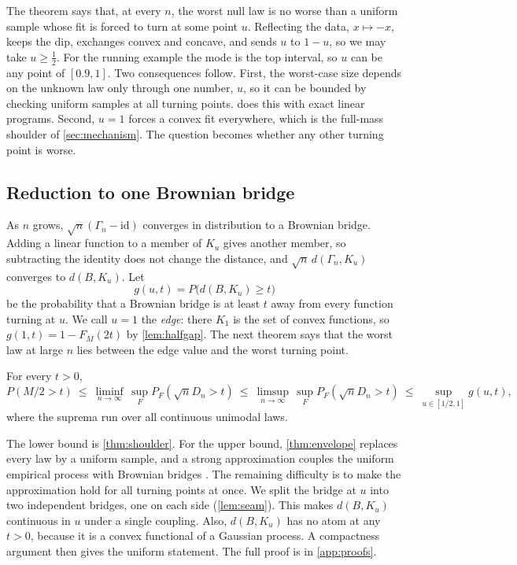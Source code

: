 The theorem says that, at every $n$, the worst null law is no worse than a uniform sample whose fit is forced to turn at some point $u$. Reflecting the data, $x\mapsto-x$, keeps the dip, exchanges convex and concave, and sends $u$ to $1-u$, so we may take $u\ge\frac12$. For the running example the mode is the top interval, so $u$ can be any point of $[0.9,1]$. Two consequences follow. First, the worst-case size depends on the unknown law only through one number, $u$, so it can be bounded by checking uniform samples at all turning points.  does this with exact linear programs. Second, $u=1$ forces a convex fit everywhere, which is the full-mass shoulder of \cref{sec:mechanism}. The question becomes whether any other turning point is worse.

\subsection{Reduction to one Brownian bridge}
As $n$ grows, $\sqrt n(\Gamma_n-\mathrm{id})$ converges in distribution to a Brownian bridge. Adding a linear function to a member of $K_u$ gives another member, so subtracting the identity does not change the distance, and $\sqrt n\,d(\Gamma_n,K_u)$ converges to $d(B,K_u)$. Let
\[
g(u,t)=P\bigl(d(B,K_u)\ge t\bigr)
\]
be the probability that a Brownian bridge is at least $t$ away from every function turning at $u$. We call $u=1$ the \emph{edge}: there $K_1$ is the set of convex functions, so $g(1,t)=1-F_M(2t)$ by \cref{lem:halfgap}. The next theorem says that the worst law at large $n$ lies between the edge value and the worst turning point.

\begin{theorem}\label{thm:reduction}
For every $t>0$,
\[
P(M/2>t)\ \le\ \liminf_{n\to\infty}\,\sup_F P_F(\sqrt nD_n>t)\ \le\ \limsup_{n\to\infty}\,\sup_F P_F(\sqrt nD_n>t)\ \le\ \sup_{u\in[1/2,1]}g(u,t),
\]
where the suprema run over all continuous unimodal laws.
\end{theorem}

The lower bound is \cref{thm:shoulder}. For the upper bound, \cref{thm:envelope} replaces every law by a uniform sample, and a strong approximation couples the uniform empirical process with Brownian bridges \cite{KMT75}. The remaining difficulty is to make the approximation hold for all turning points at once. We split the bridge at $u$ into two independent bridges, one on each side (\cref{lem:seam}). This makes $d(B,K_u)$ continuous in $u$ under a single coupling. Also, $d(B,K_u)$ has no atom at any $t>0$, because it is a convex functional of a Gaussian process. A compactness argument then gives the uniform statement. The full proof is in \cref{app:proofs}.

